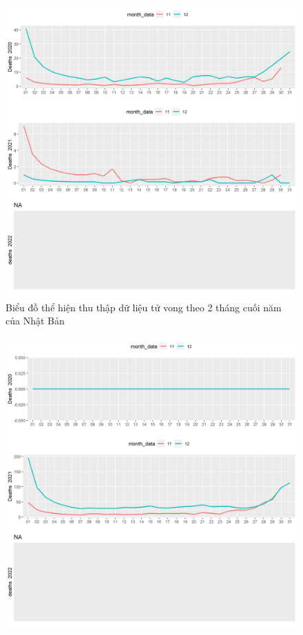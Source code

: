 \documentclass[a4paper]{article}
\theoremstyle{definition}
\begin{document}
\begin{enumerate}[i)]
\begin{enumerate}[1)]
\begin{figure}[htp]
		    \includegraphics[scale = 0.7]{Images/VI/vi5 Japan .jpeg}
		    \caption{Biểu đồ thể hiện thu thập dữ liệu tử vong theo 2 tháng cuối năm của Nhật Bản}
		    \label{fig:my_label}
		\end{figure}
		\begin{figure}[htp]
		    \centering
		    \includegraphics[scale = 0.7]{Images/VI/vi5 Vietnam .jpeg} 

\end{figure}
\end{enumerate}
\end{enumerate}
\end{document}
